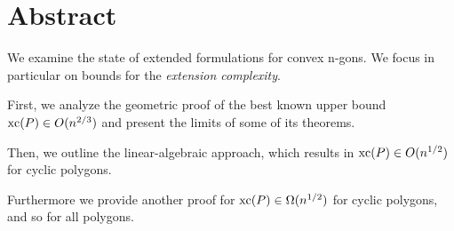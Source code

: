 \section*{Abstract}

We examine the state of extended formulations for convex n-gons. We focus in particular on bounds for the \emph{extension complexity}.

First, we analyze the geometric proof of the best known upper bound $\operatorname{xc}(P) \in O(n^{2/3})$ and present the limits of some of its theorems.

Then, we outline the linear-algebraic approach, which results in $\operatorname{xc}(P) \in O(n^{1/2})$ for cyclic polygons.

Furthermore we provide another proof for $\operatorname{xc}(P) \in \Omega(n^{1/2})$ for cyclic polygons, and so for all polygons.
